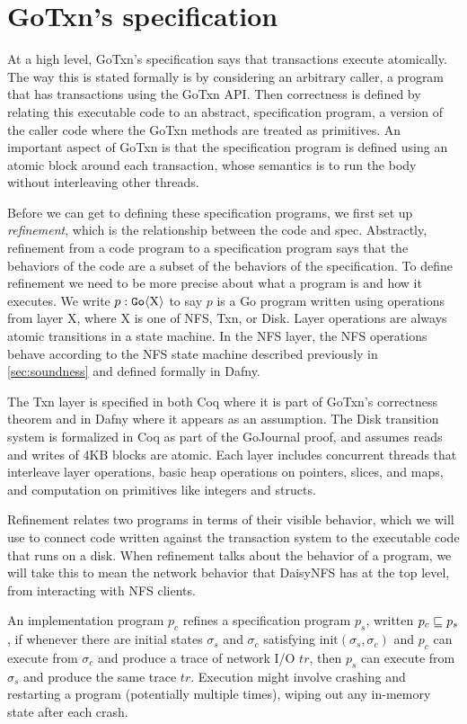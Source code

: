 \section{GoTxn's specification}

At a high level, GoTxn's specification says that transactions execute
atomically. The way this is stated formally is by considering an arbitrary
caller, a program that has transactions using the GoTxn API. Then correctness is
defined by relating this executable code to an abstract, specification program,
a version of the caller code where the GoTxn methods are treated as primitives.
An important aspect of GoTxn is that the specification program is defined using
an atomic block around each transaction, whose semantics is to run the body
without interleaving other threads.

Before we can get to defining these specification programs, we first set up
\emph{refinement}, which is the relationship between the code and spec.
Abstractly, refinement from a code program to
a specification program says that the behaviors of the code are a subset of the
behaviors of the specification.
To define refinement we need to be more precise about what a program is and how it
executes. We
write $p : \mathtt{Go}\langle \mathrm{X} \rangle$ to say $p$ is a Go program written using operations
from layer X, where X is one of NFS, Txn, or Disk.
Layer operations are always atomic transitions in a state machine. In the
NFS layer, the NFS operations behave according to the NFS state machine
described previously in \cref{sec:soundness} and defined formally in Dafny.

The Txn layer is specified in both Coq where it is part of GoTxn's correctness
theorem and in Dafny where it appears as an assumption. The Disk transition
system is formalized in Coq as part of the GoJournal proof, and assumes reads
and writes of 4KB blocks are atomic. Each layer includes concurrent threads that
interleave layer operations, basic heap operations on pointers, slices, and
maps, and computation on primitives like integers and structs.

Refinement relates two programs in terms of their visible behavior, which we
will use to connect code written against the transaction system to the
executable code that runs on a disk. When refinement talks about the behavior of
a program, we will take this to mean the network behavior that DaisyNFS has at
the top level, from interacting with NFS clients.

\begin{definition}[Refinement]
  An implementation program $p_{c}$ refines a specification program $p_{s}$,
written $p_{c} \sqsubseteq p_{s}$, if whenever there are initial states
$\sigma_{s}$ and $\sigma_{c}$ satisfying $\mathrm{init}(\sigma_{s}, \sigma_{c})$
and $p_{c}$ can execute from $\sigma_{c}$ and produce a trace of network I/O
$tr$, then $p_{s}$ can execute from $\sigma_{s}$ and produce the same trace
$tr$.  Execution might involve crashing and restarting a program (potentially
multiple times), wiping out any in-memory state after each crash.
  \label{def:refinement}
\end{definition}

